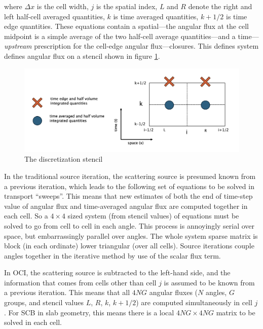 where $\Delta x$ is the cell width, $j$ is the spatial index, $L$ and $R$ denote the right and left half-cell averaged quantities, $k$ is time averaged quantities, $k+1/2$ is time edge quantities.
These equations contain a spatial---the angular flux at the cell midpoint is a simple average of the two half-cell average quantities---and a time---\textit{upstream} prescription for the cell-edge angular flux---closures.
This defines system defines angular flux on a stencil shown in figure \ref{fig:stencil}.

\begin{figure}[!htb]
    \centering
    \includegraphics[width=\textwidth]{figures/stencil.png}
    \caption{The discretization stencil}
    \label{fig:stencil}
\end{figure}


In the traditional source iteration, the scattering source is presumed known from a previous iteration, which leads to the following set of equations to be solved in transport ``sweeps''.
This means that new estimates of both the end of time-step value of angular flux and time-averaged angular flux are computed together in each cell. 
So a $4\times4$ sized system (from stencil values) of equations must be solved to go from cell to cell in each angle.
This process is annoyingly serial over space, but embarrassingly parallel over angles.
The whole system sparse matrix is block (in each ordinate) lower triangular (over all cells).
Source iterations couple angles together in the iterative method by use of the scalar flux term.

In OCI, the scattering source is subtracted to the left-hand side, and the information that comes from cells other than cell $j$ is assumed to be known from a previous iteration.
This means that all $4NG$ angular fluxes ($N$ angles, $G$ groups, and stencil values $L$, $R$, $k$, $k+1/2$) are computed simultaneously in cell $j$.
For SCB in slab geometry, this means there is a local $4NG \times 4NG$ matrix to be solved in each cell.


